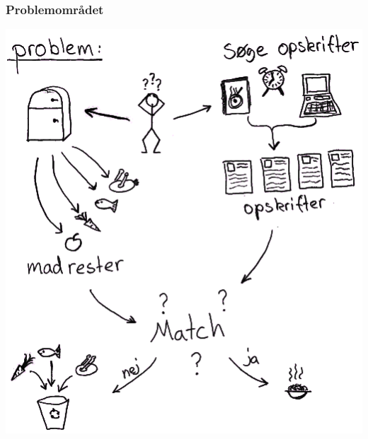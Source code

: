 \begin{frame}
\frametitle{Problemområdet}

	\begin{center}
		\includegraphics[scale=0.5]{billeder/problemomraade.png}	
	\end{center}
	
\end{frame}